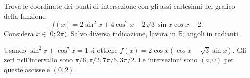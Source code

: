 
\begin{esercizio}
Trova le coordinate dei punti di intersezione con gli assi
cartesiani del grafico della funzione: 
\[
f(x)=2\sin^2 x+4\cos^2 x
-2\sqrt{3}\sin x\cos x-2.
\]
Considera $x\in[0;2\pi)$.
Salvo diversa indicazione, lavora in $\mathbb R$; angoli in radianti.
\end{esercizio}

\begin{soluzione}
Usando $\sin^2x+\cos^2x=1$ si ottiene
$f(x)=2\cos x(\cos x-\sqrt3\sin x)$.
Gli zeri nell'intervallo sono $\pi/6,\pi/2,7\pi/6,3\pi/2$.
Le intersezioni sono $(a,0)$ per queste ascisse e $(0,2)$.
\end{soluzione}
